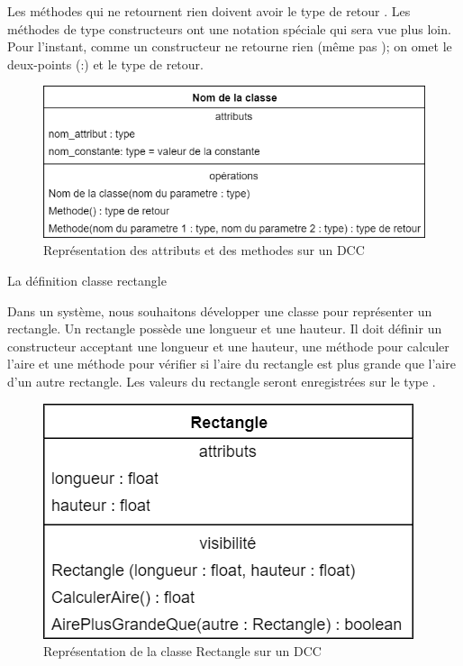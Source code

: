 Les méthodes qui ne retournent rien doivent avoir le type de retour . Les méthodes de type \glspl{constructeur} ont une notation spéciale qui sera vue plus loin. Pour l'instant, comme un \gls{constructeur} ne retourne rien (même pas ); on omet le deux-points ({\NoAutoSpacing  :}) et le type de retour. 


\begin{figure}[H]
	\caption{Représentation des \glspl{attribut} et des \glspl{methode} sur un \acrshort{DCC}}
	\centering
	\includegraphics[scale=0.4]{dcc-attributs-methodes.png}
\end{figure}

\begin{exemple}[label = ex:rectangle-1]{La définition classe rectangle}
	
	Dans un système, nous souhaitons développer une classe pour représenter un rectangle. Un rectangle possède une longueur et une hauteur. Il doit définir un constructeur acceptant une longueur et une hauteur, une méthode pour calculer l'aire et une méthode pour vérifier si l'aire du rectangle est plus grande que l'aire d'un autre rectangle. Les valeurs du rectangle seront enregistrées sur le type .
	
	\begin{figure}[H]
		\caption{Représentation de la classe Rectangle sur un \acrshort{DCC}}
		\centering
		\includegraphics[scale=0.4]{dcc-rect-attributs-methodes.png}
	\end{figure}
	
	
\end{exemple}

